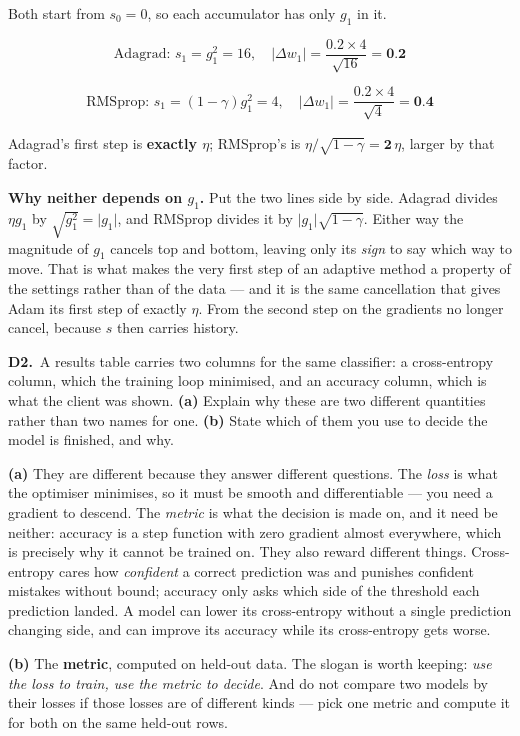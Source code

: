 \documentclass[10pt,a4paper]{article}
\newcommand{\sol}[1]{\textbf{#1}}
\begin{document}
\vspace{2pt}

Both start from $s_0 = 0$, so each accumulator has only $g_1$ in it.

\[ \text{Adagrad: } s_1 = g_1^2 = 16, \quad \lvert \Delta w_1 \rvert = \frac{0.2 \times 4}{\sqrt{16}} = \sol{0.2} \]

\[ \text{RMSprop: } s_1 = (1-\gamma) g_1^2 = 4, \quad \lvert \Delta w_1 \rvert = \frac{0.2 \times 4}{\sqrt{4}} = \sol{0.4} \]

Adagrad's first step is \sol{exactly $\eta$}; RMSprop's is $\eta/\sqrt{1-\gamma} = \sol{2}\,\eta$, larger by that factor.

\vspace{2pt}

\textbf{Why neither depends on $g_1$.} Put the two lines side by side. Adagrad divides $\eta g_1$ by $\sqrt{g_1^2} = \lvert g_1 \rvert$, and RMSprop divides it by $\lvert g_1 \rvert \sqrt{1-\gamma}$. Either way the magnitude of $g_1$ cancels top and bottom, leaving only its \emph{sign} to say which way to move. That is what makes the very first step of an adaptive method a property of the settings rather than of the data --- and it is the same cancellation that gives Adam its first step of exactly $\eta$. From the second step on the gradients no longer cancel, because $s$ then carries history.

\vspace{6pt}

\textbf{D2.}\ A results table carries two columns for the same classifier: a cross-entropy column, which the training loop minimised, and an accuracy column, which is what the client was shown. \textbf{(a)} Explain why these are two different quantities rather than two names for one. \textbf{(b)} State which of them you use to decide the model is finished, and why.

\vspace{2pt}

\textbf{(a)} They are different because they answer different questions. The \emph{loss} is what the optimiser minimises, so it must be smooth and differentiable --- you need a gradient to descend. The \emph{metric} is what the decision is made on, and it need be neither: accuracy is a step function with zero gradient almost everywhere, which is precisely why it cannot be trained on. They also reward different things. Cross-entropy cares how \emph{confident} a correct prediction was and punishes confident mistakes without bound; accuracy only asks which side of the threshold each prediction landed. A model can lower its cross-entropy without a single prediction changing side, and can improve its accuracy while its cross-entropy gets worse.\par\vspace{1mm}\textbf{(b)} The \textbf{metric}, computed on held-out data. The slogan is worth keeping: \emph{use the loss to train, use the metric to decide}. And do not compare two models by their losses if those losses are of different kinds --- pick one metric and compute it for both on the same held-out rows.
\end{document}
